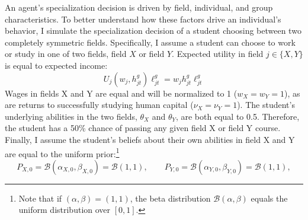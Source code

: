 \documentclass[10 pt]{article}
\begin{document}
An agent's specialization decision is driven by field, individual, and group characteristics.
To better understand how these factors drive an individual's behavior, I simulate the specialization decision of a student choosing between two completely symmetric fields.
Specifically, I assume a student can choose to work or study in one of two fields, field $X$ or field $Y$. 
Expected utility in field $j \in \{X, Y\}$ is equal to expected income: 
\begin{equation}\label{eq:linear_utility}
    U_j(w_j, h_{jt}^g) \ell_{jt}^g = w_j h_{jt}^g \ell_{jt}^g
\end{equation}
Wages in fields X and Y are equal and will be normalized to 1 ($w_X = w_Y = 1$), as are returns to successfully studying human capital ($\nu_X = \nu_Y = 1$).
The student's underlying abilities in the two fields, $\theta_X$ and $\theta_Y$, are both equal to 0.5. Therefore, the student has a 50\% chance of passing any given field X or field Y course.
Finally, I assume the student's beliefs about their own abilities in field X and Y are equal to the uniform prior:\footnote{
    Note that if $(\alpha, \beta) = (1, 1)$, the beta distribution $\mathcal{B} (\alpha, \beta)$ equals the uniform distribution over $[0, 1]$. 
}
\begin{equation*}
    P_{X,0} = \mathcal{B}(\alpha_{X, 0}, \beta_{X, 0}) = \mathcal{B} (1, 1), 
    \quad \quad 
    P_{Y,0} = \mathcal{B}(\alpha_{Y, 0}, \beta_{Y, 0}) = \mathcal{B} (1, 1), 
\end{equation*}
\end{document}

